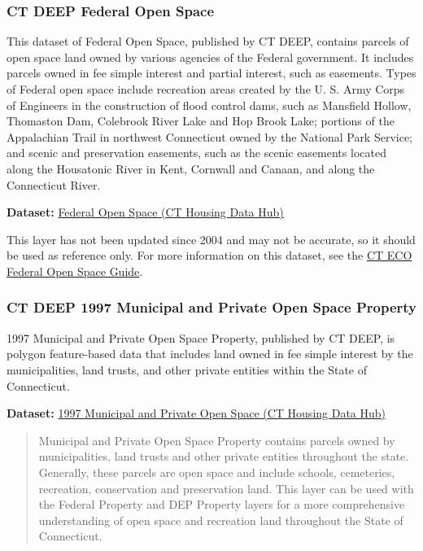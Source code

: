 \documentclass[
  letterpaper,
  DIV=11,
  numbers=noendperiod]{scrreprt}
\begin{document}
\subsubsection{CT DEEP Federal Open
Space}\label{sec-ct-deep-federal-open-space}

This dataset of Federal Open Space, published by CT DEEP, contains
parcels of open space land owned by various agencies of the Federal
government. It includes parcels owned in fee simple interest and partial
interest, such as easements. Types of Federal open space include
recreation areas created by the U. S. Army Corps of Engineers in the
construction of flood control dams, such as Mansfield Hollow, Thomaston
Dam, Colebrook River Lake and Hop Brook Lake; portions of the
Appalachian Trail in northwest Connecticut owned by the National Park
Service; and scenic and preservation easements, such as the scenic
easements located along the Housatonic River in Kent, Cornwall and
Canaan, and along the Connecticut River.

\textbf{Dataset:}
\href{https://housingmaps.ct.gov/datasets/CTDEEP::federal-open-space/about}{Federal
Open Space (CT Housing Data Hub)}

This layer has not been updated since 2004 and may not be accurate, so
it should be used as reference only. For more information on this
dataset, see the
\href{https://cteco.uconn.edu/guides/Federal_Open_Space.htm}{CT ECO
Federal Open Space Guide}.

\subsubsection{CT DEEP 1997 Municipal and Private Open Space
Property}\label{sec-ct-deep-1997-municipal-and-private-open-space-property}

1997 Municipal and Private Open Space Property, published by CT DEEP, is
polygon feature-based data that includes land owned in fee simple
interest by the municipalities, land trusts, and other private entities
within the State of Connecticut.

\textbf{Dataset:}
\href{https://housingmaps.ct.gov/datasets/CTDEEP::1997-municipal-and-private-open-space/about}{1997
Municipal and Private Open Space (CT Housing Data Hub)}

\begin{quote}
Municipal and Private Open Space Property contains parcels owned by
municipalities, land trusts and other private entities throughout the
state. Generally, these parcels are open space and include schools,
cemeteries, recreation, conservation and preservation land. This layer
can be used with the Federal Property and DEP Property layers for a more
comprehensive understanding of open space and recreation land throughout
the State of Connecticut.
\end{quote}
\end{document}
